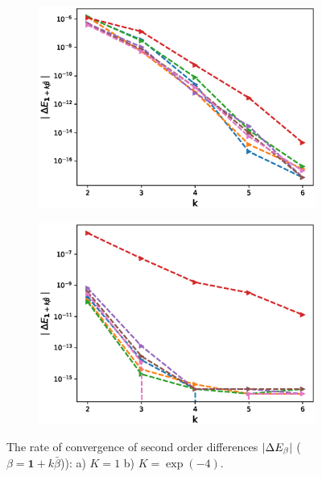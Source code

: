 \documentclass[11pt]{article}
\begin{document}
\begin{figure}[h!]
	\centering
	\begin{subfigure}{.5\textwidth}
		\centering
		\includegraphics[width=1\linewidth]{./figures/mixed_diff_second_way/H_007/N_16/mixed_difference_order2_rbergomi_16steps_H_007_K_1.eps}
		\caption{}
		\label{fig:sub3}
	\end{subfigure}%
	\begin{subfigure}{.5\textwidth}
		\centering
		\includegraphics[width=1\linewidth]{./figures/mixed_diff_second_way/H_007/N_16/mixed_difference_order2_rbergomi_16steps_H_007_K_exp__4.eps}
		\caption{}
		\label{fig:sub4}
	\end{subfigure}
	
	\caption{The rate of convergence of  second order differences $\left\lvert\Delta E_{\beta}\right\rvert$ ($\beta=\mathbf{1}+k \bar{\beta}$)): a) $K=1$ b)  $K=\operatorname{exp}(-4).$}
	\label{fig:test2}
\end{figure}
\end{document}

